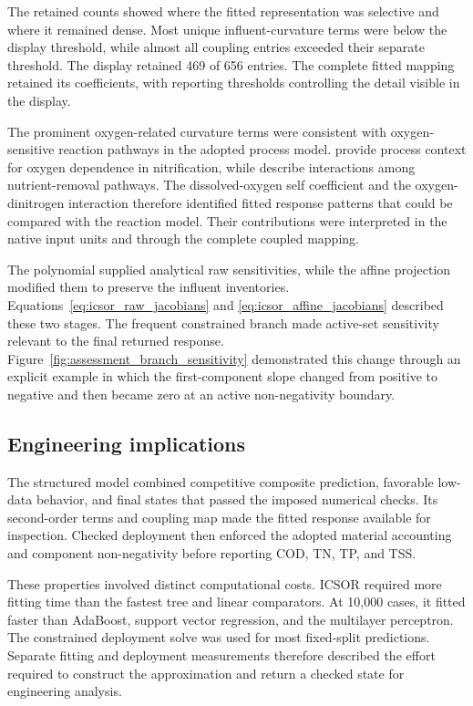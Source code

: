 The retained counts showed where the fitted representation was selective and where it remained dense. Most unique influent-curvature terms were below the display threshold, while almost all coupling entries exceeded their separate threshold. The display retained 469 of 656 entries. The complete fitted mapping retained its coefficients, with reporting thresholds controlling the detail visible in the display.

The prominent oxygen-related curvature terms were consistent with oxygen-sensitive reaction pathways in the adopted process model. \citet{StenstromSong1991} provide process context for oxygen dependence in nitrification, while \citet{Wentzel1992} describe interactions among nutrient-removal pathways. The dissolved-oxygen self coefficient and the oxygen-dinitrogen interaction therefore identified fitted response patterns that could be compared with the reaction model. Their contributions were interpreted in the native input units and through the complete coupled mapping.

The polynomial supplied analytical raw sensitivities, while the affine projection modified them to preserve the influent inventories. Equations~\eqref{eq:icsor_raw_jacobians} and \eqref{eq:icsor_affine_jacobians} described these two stages. The frequent constrained branch made active-set sensitivity relevant to the final returned response. Figure~\ref{fig:assessment_branch_sensitivity} demonstrated this change through an explicit example in which the first-component slope changed from positive to negative and then became zero at an active non-negativity boundary.

\subsection{Engineering implications}

The structured model combined competitive composite prediction, favorable low-data behavior, and final states that passed the imposed numerical checks. Its second-order terms and coupling map made the fitted response available for inspection. Checked deployment then enforced the adopted material accounting and component non-negativity before reporting COD, TN, TP, and TSS.

These properties involved distinct computational costs. ICSOR required more fitting time than the fastest tree and linear comparators. At 10,000 cases, it fitted faster than AdaBoost, support vector regression, and the multilayer perceptron. The constrained deployment solve was used for most fixed-split predictions. Separate fitting and deployment measurements therefore described the effort required to construct the approximation and return a checked state for engineering analysis.

